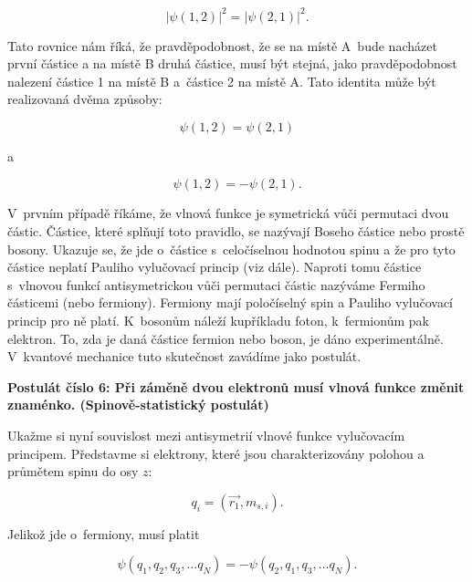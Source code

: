 \begin{equation}
\vert \psi(1,2) \vert^2 = \vert \psi(2,1) \vert^2.
\label{rov:VE-25}
\end{equation}

\noindent Tato rovnice nám říká, že pravděpodobnost, že se na místě A~bude nacházet první částice a na místě B druhá částice, musí být stejná, jako pravděpodobnost nalezení částice 1 na místě B a~částice 2 na místě A. Tato identita může být realizovaná dvěma způsoby:

\begin{equation}
\psi(1,2) = \psi(2,1)
\label{rov:VE-26}
\end{equation}

\noindent a

\begin{equation}
\psi(1,2) = - \psi(2,1).
\label{rov:VE-27}
\end{equation}


\noindent V~prvním případě říkáme, že vlnová funkce je symetrická vůči permutaci dvou částic. Částice, které splňují toto pravidlo, se nazývají Boseho částice nebo prostě bosony. Ukazuje se, že jde o~částice s~celočíselnou hodnotou spinu a že pro tyto částice neplatí Pauliho vylučovací princip (viz dále). Naproti tomu částice s~vlnovou funkcí antisymetrickou vůči permutaci částic nazýváme Fermiho částicemi (nebo fermiony). Fermiony mají poločíselný spin a Pauliho vylučovací princip pro ně platí. K~bosonům náleží kupříkladu foton, k~fermionům pak elektron. To, zda je daná částice fermion nebo boson, je dáno experimentálně. V~kvantové mechanice tuto skutečnost zavádíme jako postulát.

\bigskip
\textbf{Postulát číslo 6: Při záměně dvou elektronů musí vlnová funkce změnit znaménko. (Spinově-statistický postulát)}
\bigskip

Ukažme si nyní souvislost mezi antisymetrií vlnové funkce vylučovacím principem. Představme si elektrony, které jsou charakterizovány polohou a průmětem spinu do osy $z$:

\begin{equation}
q_i = (\vec{r_1},m_{s,i}).
\label{rov:VE-28}
\end{equation}

\noindent Jelikož jde o~fermiony, musí platit 

\begin{equation}
\psi(q_1,q_2,q_3, \dots q_N) = -\psi(q_2,q_1,q_3, \dots q_N).
\label{rov:VE-29}
\end{equation}


